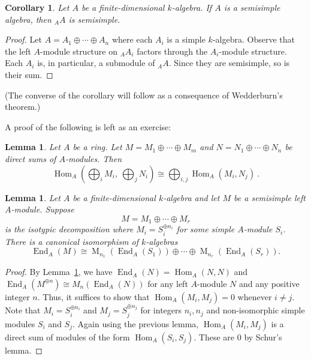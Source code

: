 \documentclass[12pt]{article}
\theoremstyle{plain}
\newtheorem{lemma}[theorem]{Lemma}
\newtheorem{corollary}[theorem]{Corollary}
\theoremstyle{definition}
\theoremstyle{remark}
\numberwithin{equation}{section}
\begin{document}
\begin{corollary} \label{cor:semisimple_def}
Let $A$ be a finite-dimensional $k$-algebra.
If $A$ is a semisimple algebra, then ${}_AA$ is semisimple.
\end{corollary}

\begin{proof}
Let $A = A_1 \oplus \cdots \oplus A_n$ where each $A_i$ is a simple
$k$-algebra. Observe that the left $A$-module structure on ${}_AA_i$
factors through the $A_i$-module structure.
Each $A_i$ is, in particular, a submodule of ${}_AA$.
Since they are semisimple, so is their sum.
\end{proof}

(The converse of the corollary will follow as a consequence of
Wedderburn's theorem.)

A proof of the following is left as an exercise:

\begin{lemma} \label{lem:fancyMatrix}
Let $A$ be a ring.
Let $M= M_1 \oplus \cdots \oplus M_m$ and
$N=N_1 \oplus \cdots \oplus N_n$ be direct sums of $A$-modules.
Then
\[ \operatorname{Hom}_A\left(\bigoplus_iM_i,\ \bigoplus_jN_i\right)
\cong \bigoplus_{i,j}\operatorname{Hom}_A(M_i, N_j) \ . \]
\end{lemma}

\begin{lemma}
Let $A$ be a finite-dimensional $k$-algebra and
let $M$ be a semisimple left $A$-module.
Suppose
\[
M = M_1 \oplus \cdots \oplus M_r
\]
is the isotypic decomposition where $M_i=S_i^{\oplus n_i}$
for some simple $A$-module $S_i$.
There is a canonical isomorphism of $k$-algebras
\[
\operatorname{End}_A(M) \cong \operatorname{M}_{n_1}(\operatorname{End}_A(S_1))
\oplus \cdots \oplus
\operatorname{M}_{n_r}(\operatorname{End}_A(S_r)) .
\]
\end{lemma}

\begin{proof}
By Lemma~\ref{lem:fancyMatrix},
we have $\operatorname{End}_A(N) = \operatorname{Hom}_A(N,N)$ and
$\operatorname{End}_A(M^{\oplus n}) \cong M_n(\operatorname{End}_A(N))$
for any left $A$-module $N$ and any positive integer $n$.
Thus, it suffices
to show that $\operatorname{Hom}_A(M_i,M_j)=0$ whenever $i \ne j$.
Note that $M_i=S_i^{\oplus n_i}$ and $M_j=S_j^{\oplus n_j}$
for integers $n_i, n_j$ and
non-isomorphic simple modules $S_i$ and $S_j$.
Again using the previous lemma, $\operatorname{Hom}_A(M_i,M_j)$ is a direct sum of
modules of the form $\operatorname{Hom}_A(S_i,S_j)$.  These are $0$ by Schur's lemma.
\end{proof}
\end{document}
